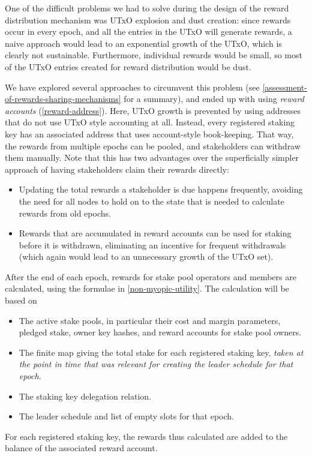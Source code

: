 \documentclass[11pt,a4paper,dvipsnames,twosided]{article}
\begin{document}
One of the difficult problems we had to solve during the design of the
reward distribution mechanism was UTxO explosion and dust creation:
since rewards occur in every epoch, and all the entries in the UTxO
will generate rewards, a naive approach would lead to an exponential
growth of the UTxO, which is clearly not sustainable. Furthermore,
individual rewards would be small, so most of the UTxO entries created
for reward distribution would be dust.

We have explored several approaches to circumvent this problem
(see \cref{assessment-of-rewards-sharing-mechanisms} for a summary),
and ended up with using \emph{reward accounts}
(\cref{reward-address}). Here, UTxO growth is prevented by using
addresses that do not use UTxO style accounting at all. Instead, every
registered staking key has an associated address that uses
account-style book-keeping. That way, the rewards from multiple epochs
can be pooled, and stakeholders can withdraw them manually. Note that
this has two advantages over the superficially simpler approach of
having stakeholders claim their rewards directly:
\begin{itemize}
\item Updating the total rewards a stakeholder is due happens
  frequently, avoiding the need for all nodes to hold on to the state
  that is needed to calculate rewards from old epochs.
\item Rewards that are accumulated in reward accounts can be used for
  staking before it is withdrawn, eliminating an incentive for
  frequent withdrawals (which again would lead to an unnecessary
  growth of the UTxO set).
\end{itemize}

After the end of each epoch, rewards for stake pool operators and members are
calculated, using the formulae in \cref{non-myopic-utility}. The calculation
will be based on
\begin{itemize}
\item The active stake pools, in particular their cost and margin parameters,
  pledged stake, owner key hashes, and reward accounts for stake pool owners.
\item The finite map giving the total stake for each registered
  staking key, \emph{taken at the point in time that was relevant for
    creating the leader schedule for that epoch}.
\item The staking key delegation relation.
\item The leader schedule and list of empty slots for that epoch.
\end{itemize}
For each registered staking key, the rewards thus calculated are added
to the balance of the associated reward account.
\end{document}
